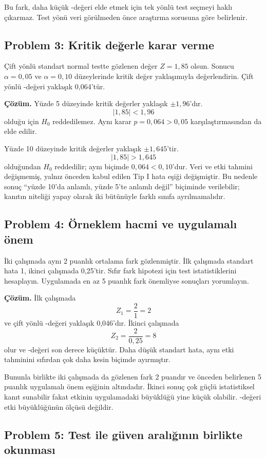 Bu fark, daha küçük \pval-değeri elde etmek için tek yönlü test seçmeyi haklı
çıkarmaz. Test yönü veri görülmeden önce araştırma sorusuna göre belirlenir.

\subsection*{Problem 3: Kritik değerle karar verme}

Çift yönlü standart normal testte gözlenen değer $Z=1{,}85$ olsun. Sonucu
$\alpha=0{,}05$ ve $\alpha=0{,}10$ düzeylerinde kritik değer yaklaşımıyla
değerlendirin. Çift yönlü \pval-değeri yaklaşık 0,064'tür.

\textbf{Çözüm.} Yüzde 5 düzeyinde kritik değerler yaklaşık $\pm1{,}96$'dır.
\[
|1{,}85|<1{,}96
\]
olduğu için $H_0$ reddedilemez. Aynı karar $p=0{,}064>0{,}05$
karşılaştırmasından da elde edilir.

Yüzde 10 düzeyinde kritik değerler yaklaşık $\pm1{,}645$'tir.
\[
|1{,}85|>1{,}645
\]
olduğundan $H_0$ reddedilir; aynı biçimde $0{,}064<0{,}10$'dur. Veri ve etki
tahmini değişmemiş, yalnız önceden kabul edilen Tip I hata eşiği değişmiştir.
Bu nedenle sonuç ``yüzde 10'da anlamlı, yüzde 5'te anlamlı değil'' biçiminde
verilebilir; kanıtın niteliği yapay olarak iki bütünüyle farklı sınıfa
ayrılmamalıdır.

\subsection*{Problem 4: Örneklem hacmi ve uygulamalı önem}

İki çalışmada aynı 2 puanlık ortalama fark gözlenmiştir. İlk çalışmada
standart hata 1, ikinci çalışmada 0,25'tir. Sıfır fark hipotezi için test
istatistiklerini hesaplayın. Uygulamada en az 5 puanlık fark önemliyse
sonuçları yorumlayın.

\textbf{Çözüm.} İlk çalışmada
\[
Z_1=\frac{2}{1}=2
\]
ve çift yönlü \pval-değeri yaklaşık 0,046'dır. İkinci çalışmada
\[
Z_2=\frac{2}{0{,}25}=8
\]
olur ve \pval-değeri son derece küçüktür. Daha düşük standart hata, aynı etki
tahminini sıfırdan çok daha kesin biçimde ayırmıştır.

Bununla birlikte iki çalışmada da gözlenen fark 2 puandır ve önceden
belirlenen 5 puanlık uygulamalı önem eşiğinin altındadır. İkinci sonuç çok
güçlü istatistiksel kanıt sunabilir fakat etkinin uygulamadaki büyüklüğü yine
küçük olabilir. \pval-değeri etki büyüklüğünün ölçüsü değildir.

\subsection*{Problem 5: Test ile güven aralığının birlikte okunması}

